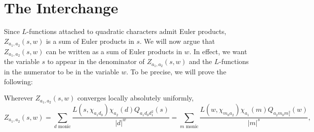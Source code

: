 \documentclass[12pt,reqno,oneside]{amsart}
\begin{document}
\section{The Interchange}
    Since $L$-functions attached to quadratic characters admit Euler products, $Z_{a_{1},a_{2}}(s,w)$ is a sum of Euler products in $s$. We will now argue that $Z_{a_{1},a_{2}}(s,w)$ can be written as a sum of Euler products in $w$. In effect, we want the variable $s$ to appear in the denominator of $Z_{a_{1},a_{2}}(s,w)$ and the $L$-functions in the numerator to be in the variable $w$. To be precise, we will prove the following:

    \begin{theorem}
        Wherever $Z_{a_{1},a_{2}}(s,w)$ converges locally absolutely uniformly,
        \[
            Z_{a_{1},a_{2}}(s,w) = \sum_{\text{$d$ monic}}\frac{L(s,\chi_{a_{1}d_{0}})\chi_{a_{2}}(d)Q_{a_{1}d_{0}d_{1}^{2}}(s)}{|d|^{w}} = \sum_{\text{$m$ monic}}\frac{L(w,\chi_{m_{0}a_{2}})\chi_{a_{1}}(m)Q_{a_{2}m_{0}m_{1}^{2}}(w)}{|m|^{s}},
        \]
    \end{theorem}
\end{document}

